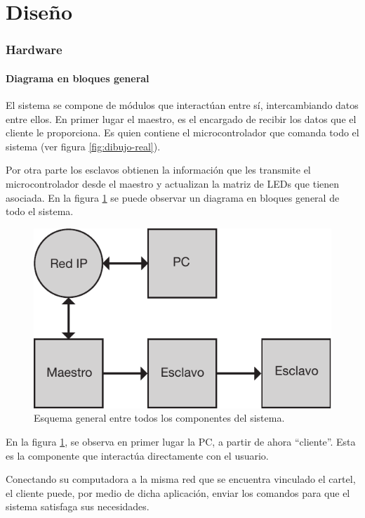 \part{Diseño}\label{part:diseno}

\section{Hardware}\label{sec:hw}
\subsection{Diagrama en bloques general}
El sistema se compone de módulos que interactúan entre sí, intercambiando datos entre ellos. En primer lugar el maestro, es el encargado de recibir los datos que el cliente le proporciona. Es quien contiene el microcontrolador que comanda todo el sistema (ver figura \ref{fig:dibujo-real}).

Por otra parte los esclavos obtienen la información que les transmite el microcontrolador desde el maestro y actualizan la matriz de LEDs que tienen asociada. En la figura \ref{fig:diagrama-bloques-general} se puede observar un diagrama en bloques general de todo el sistema.

\begin{figure}[ht!]
	\centering
	\includegraphics[scale=1]{imagenes/esquema-general.pdf}
	\caption{Esquema general entre todos los componentes del sistema.}
	\label{fig:diagrama-bloques-general}
\end{figure}

En la figura \ref{fig:diagrama-bloques-general}, se observa en primer lugar la PC, a partir de ahora \enquote{cliente}. Esta es la componente que interactúa directamente con el usuario.

Conectando su computadora a la misma red que se encuentra vinculado el cartel, el cliente puede, por medio de dicha aplicación, enviar los comandos para que el sistema satisfaga sus necesidades.

